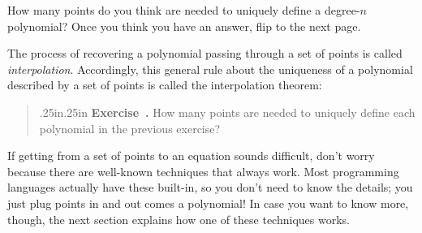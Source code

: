 \documentclass[12 pt]{article}
\newcounter{exercise}[section]
\newenvironment{exercise}{\refstepcounter{exercise}\par\bigskip \begin{quotation}{}{\leftmargin .25in\rightmargin .25in}
    \noindent \textbf{Exercise~\thesection.\theexercise }  \rmfamily}{\end{quotation}\par\bigskip}
\begin{document}
\begin{center}
\end{center}

How many points do you think are needed to uniquely define a degree-$n$
polynomial? Once you think you have an answer, flip to the next page.

\newpage
The process of recovering a polynomial passing through a set of points is 
called \emph{interpolation}. Accordingly, this general rule about the 
uniqueness of a polynomial described by a set of points is called the 
interpolation theorem:

\setlength\fboxsep{1em}        
\begin{center}
\end{center}

\begin{exercise}
    How many points are needed to uniquely define each polynomial 
    in the previous exercise?
\end{exercise}

If getting from a set of points to an equation sounds difficult, don't worry because 
there are well-known techniques that always work. Most programming languages 
actually have these built-in, so you don't need to know the details; you just 
plug points in and out comes a polynomial! In case you want to know more, though,
the next section explains how one of these techniques works.
\end{document}
